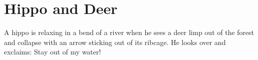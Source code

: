 \chapter{Hippo and Deer}
\lettrine[lines=3,loversize=-0.2,lraise=0.2]{A}{} hippo is relaxing in a bend of a river when he sees a deer limp out of the forest and collapse with an arrow sticking out of its ribcage. He looks over and exclaims:
 Stay out of my water!
